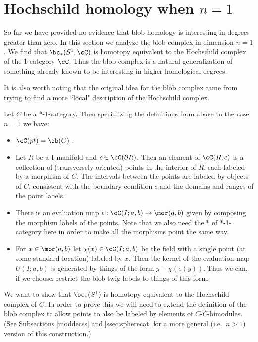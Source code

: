 
\section{Hochschild homology when $n=1$}
\label{sec:hochschild}

So far we have provided no evidence that blob homology is interesting in degrees 
greater than zero.
In this section we analyze the blob complex in dimension $n=1$.
We find that $\bc_*(S^1, \cC)$ is homotopy equivalent to the 
Hochschild complex of the 1-category $\cC$.
Thus the blob complex is a natural generalization of something already
known to be interesting in higher homological degrees.

It is also worth noting that the original idea for the blob complex came from trying
to find a more ``local" description of the Hochschild complex.

Let $C$ be a *-1-category.
Then specializing the definitions from above to the case $n=1$ we have:
\begin{itemize}
\item $\cC(pt) = \ob(C)$ .
\item Let $R$ be a 1-manifold and $c \in \cC(\bd R)$.
Then an element of $\cC(R; c)$ is a collection of (transversely oriented)
points in the interior
of $R$, each labeled by a morphism of $C$.
The intervals between the points are labeled by objects of $C$, consistent with
the boundary condition $c$ and the domains and ranges of the point labels.
\item There is an evaluation map $e: \cC(I; a, b) \to \mor(a, b)$ given by
composing the morphism labels of the points.
Note that we also need the * of *-1-category here in order to make all the morphisms point
the same way.
\item For $x \in \mor(a, b)$ let $\chi(x) \in \cC(I; a, b)$ be the field with a single
point (at some standard location) labeled by $x$.
Then the kernel of the evaluation map $U(I; a, b)$ is generated by things of the
form $y - \chi(e(y))$.
Thus we can, if we choose, restrict the blob twig labels to things of this form.
\end{itemize}

We want to show that $\bc_*(S^1)$ is homotopy equivalent to the
Hochschild complex of $C$.
In order to prove this we will need to extend the 
definition of the blob complex to allow points to also
be labeled by elements of $C$-$C$-bimodules.
(See Subsections \ref{moddecss} and \ref{ssec:spherecat} for a more general (i.e.\ $n>1$)
version of this construction.)

